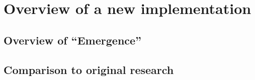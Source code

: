 \chapter{Overview of a new implementation}

\section{Overview of ``Emergence''}

\section{Comparison to original research}
